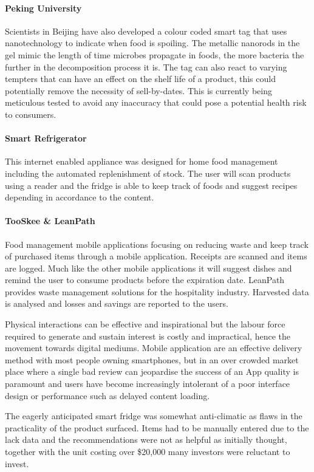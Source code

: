 \documentclass[a4paper, 11pt]{article}
\begin{document}
\paragraph{Peking University}Scientists in Beijing have also developed a colour coded smart tag that uses nanotechnology to indicate when food is spoiling. The metallic nanorods in the gel mimic the length of time microbes propagate in foods, the more bacteria the further in the decomposition process it is. The tag can also react to varying tempters that can have an effect on the shelf life of a product, this could potentially remove the necessity of sell-by-dates. This is currently being meticulous tested to avoid any inaccuracy that could pose a potential health risk to consumers.
\paragraph{Smart Refrigerator}  This internet enabled appliance was designed for home food management including the automated replenishment of stock. The user will scan products using a reader and the fridge is able to keep track of foods and suggest recipes depending in accordance to the content.

\paragraph{TooSkee \& LeanPath} Food management mobile applications focusing on reducing waste and keep track of purchased items through a mobile application. Receipts are scanned and items are logged. Much like the other mobile applications it will suggest dishes and remind the user to consume products before the expiration date. LeanPath provides waste management solutions for the hospitality industry. Harvested data is analysed and losses and savings are reported to the users.

Physical interactions can be effective and inspirational but the labour force required to generate and sustain interest is costly and impractical, hence the movement towards digital mediums. Mobile application are an effective delivery method with most people owning smartphones, but in an over crowded market place where a single bad review can jeopardise the success of an App quality is paramount and users have become increasingly intolerant of a poor interface design or performance such as delayed content loading.

The eagerly anticipated smart fridge was somewhat anti-climatic as flaws in the practicality of the product surfaced. Items had to be manually entered due to the lack data and the recommendations were not as helpful as initially thought, together with the unit costing over \$20,000 many investors were reluctant to invest.
\end{document}
